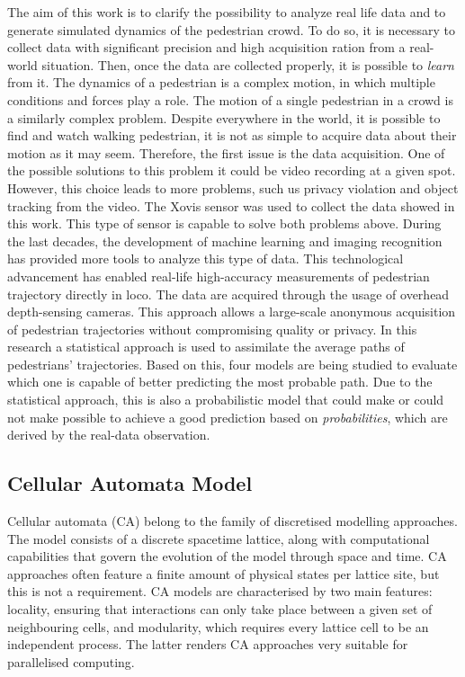 \documentclass[class=article, crop=false]{standalone}
\begin{document}
The aim of this work is to clarify the possibility to analyze real life data and to generate simulated dynamics of the pedestrian crowd. 
To do so, it is necessary to collect data with significant precision and high acquisition ration from a real-world situation. 
Then, once the data are collected properly, it is possible to \emph{learn} from it. 
The dynamics of a pedestrian is a complex motion, in which multiple conditions and forces play a role. 
The motion of a single pedestrian in a crowd is a similarly complex problem. 
Despite everywhere in the world, it is possible to find and watch walking pedestrian, it is not as simple to acquire data about their motion as it may seem. 
Therefore, the first issue is the data acquisition. 
One of the possible solutions to this problem it could be video recording at a given spot. 
However, this choice leads to more problems, such us privacy violation and object tracking from the video. 
The Xovis sensor \cite{Xovis} was used to collect the data showed in this work. 
This type of sensor is capable to solve both problems above. During the last decades, the development of machine learning and imaging recognition has provided more tools to analyze this type of data. 
This technological advancement has enabled real-life high-accuracy measurements of pedestrian trajectory directly in loco. 
The data are acquired through the usage of overhead depth-sensing cameras. 
This approach allows a large-scale anonymous acquisition of pedestrian trajectories without compromising quality or privacy. 
In this research a statistical approach is used to assimilate the average paths of pedestrians’ trajectories. 
Based on this, four models are being studied to evaluate which one is capable of better predicting the most probable path. 
Due to the statistical approach, this is also a probabilistic model that could make or could not make possible to achieve a good prediction based on \emph{probabilities}, which are derived by the real-data observation.


\subsection{Cellular Automata Model}
Cellular automata (CA) belong to the family of discretised modelling approaches. The model consists of a discrete spacetime lattice, along with computational capabilities that govern the evolution of the model through space and time. CA approaches often feature a finite amount of physical states per lattice site, but this is not a requirement. CA models are characterised by two main features: locality, ensuring that interactions can only take place between a given set of neighbouring cells, and modularity, which requires every lattice cell to be an independent process. The latter renders CA approaches very suitable for parallelised computing.
\end{document}
